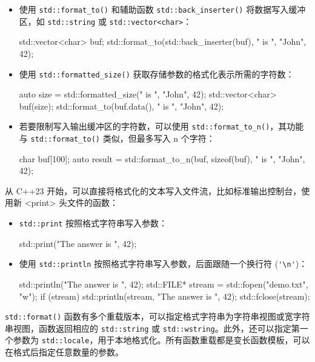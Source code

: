 \begin{itemize}
\item
使用 \verb|std::format_to()| 和辅助函数 \verb|std::back_inserter()| 将数据写入缓冲区，如 \verb|std::string| 或 \verb|std::vector<char>|：

\begin{cpp}
std::vector<char> buf;
std::format_to(std::back_inserter(buf), "{} is {}", "John", 42);
\end{cpp}

\item
使用 \verb|std::formatted_size()| 获取存储参数的格式化表示所需的字符数：

\begin{cpp}
auto size = std::formatted_size("{} is {}", "John", 42);
std::vector<char> buf(size);
std::format_to(buf.data(), "{} is {}", "John", 42);
\end{cpp}

\item
若要限制写入输出缓冲区的字符数，可以使用 \verb|std::format_to_n()|，其功能与 \verb|std::format_to()| 类似，但最多写入 n 个字符：

\begin{cpp}
char buf[100];
auto result = std::format_to_n(buf, sizeof(buf), "{} is {}", "John", 42);
\end{cpp}
\end{itemize}

从 C++23 开始，可以直接将格式化的文本写入文件流，比如标准输出控制台，使用新 <print> 头文件的函数：

\begin{itemize}
\item
\verb|std::print| 按照格式字符串写入参数：

\begin{cpp}
std::print("The answer is {}", 42);
\end{cpp}

\item
使用 \verb|std::println| 按照格式字符串写入参数，后面跟随一个换行符 (\verb|'\n'|)：

\begin{cpp}
std::println("The answer is {}", 42);
std::FILE* stream = std::fopen("demo.txt", "w");
if (stream)
{
    std::println(stream, "The answer is {}", 42);
    std::fclose(stream);
}
\end{cpp}
\end{itemize}


\verb|std::format()| 函数有多个重载版本，可以指定格式字符串为字符串视图或宽字符串视图，函数返回相应的 \verb|std::string| 或 \verb|std::wstring|。此外，还可以指定第一个参数为 \verb|std::locale|，用于本地格式化。所有函数重载都是变长函数模板，可以在格式后指定任意数量的参数。

